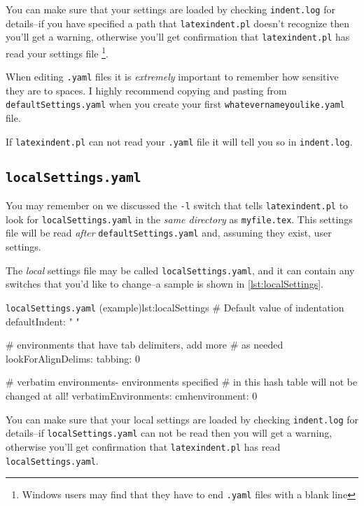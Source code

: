 \documentclass[11pt]{article}
\begin{document}
You can make sure that your settings are loaded by checking \lstinline!indent.log!
for details--if you have specified a path that \lstinline!latexindent.pl! doesn't
recognize then you'll get a warning, otherwise you'll get confirmation that
\lstinline!latexindent.pl! has read your settings file \footnote{Windows users
	may find that they have to end \lstinline!.yaml! files with a blank line}.

\begin{warning}
	When editing \lstinline!.yaml! files it is \emph{extremely} important
	to remember how sensitive they are to spaces. I highly recommend copying
	and pasting from \lstinline!defaultSettings.yaml! when you create your
	first \lstinline!whatevernameyoulike.yaml! file.

	If \lstinline!latexindent.pl! can not read your \lstinline!.yaml! file it
	will tell you so in \lstinline!indent.log!.
\end{warning}

\subsection{\lstinline!localSettings.yaml!}\label{sec:localsettings}
You may remember on  we discussed the \lstinline!-l! switch
that tells \lstinline!latexindent.pl! to look for \lstinline!localSettings.yaml! in the
\emph{same directory} as \lstinline!myfile.tex!. This settings file will
be read \emph{after} \lstinline!defaultSettings.yaml! and, assuming they exist,
user settings.

The \emph{local} settings file may be called \lstinline!localSettings.yaml!, and
it can contain any switches that you'd
like to change--a sample is shown in \cref{lst:localSettings}.

\begin{cmhlistings}[style=yaml]{\lstinline!localSettings.yaml! (example)}{lst:localSettings}
# Default value of indentation
defaultIndent: " "

# environments that have tab delimiters, add more
# as needed
lookForAlignDelims:
   tabbing: 0

#  verbatim environments- environments specified
#  in this hash table will not be changed at all!
verbatimEnvironments:
    cmhenvironment: 0
\end{cmhlistings}

You can make sure that your local settings are loaded by checking \lstinline!indent.log!
for details--if \lstinline!localSettings.yaml! can not be read then you will
get a warning, otherwise you'll get confirmation that
\lstinline!latexindent.pl! has read \lstinline!localSettings.yaml!.
\end{document}
